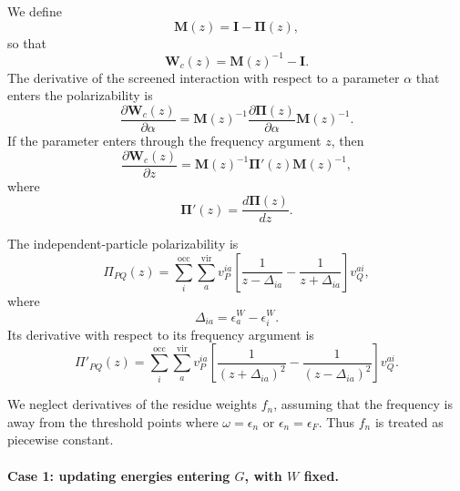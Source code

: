 We define
\begin{equation}
    \mathbf M(z)
    =
    \mathbf I-\boldsymbol{\Pi}(z),
\end{equation}
so that
\begin{equation}
    \mathbf W_c(z)
    =
    \mathbf M(z)^{-1}-\mathbf I.
\end{equation}
The derivative of the screened interaction with respect to a parameter
\(\alpha\) that enters the polarizability is
\begin{equation}
    \frac{\partial \mathbf W_c(z)}{\partial \alpha}
    =
    \mathbf M(z)^{-1}
    \frac{\partial \boldsymbol{\Pi}(z)}{\partial \alpha}
    \mathbf M(z)^{-1}.
\end{equation}
If the parameter enters through the frequency argument \(z\), then
\begin{equation}
    \frac{\partial \mathbf W_c(z)}{\partial z}
    =
    \mathbf M(z)^{-1}
    \boldsymbol{\Pi}'(z)
    \mathbf M(z)^{-1},
\end{equation}
where
\begin{equation}
    \boldsymbol{\Pi}'(z)
    =
    \frac{d\boldsymbol{\Pi}(z)}{dz}.
\end{equation}

The independent-particle polarizability is
\begin{equation}
    \Pi_{PQ}(z)
    =
    \sum_i^{\mathrm{occ}}
    \sum_a^{\mathrm{vir}}
    v_P^{ia}
    \left[
    \frac{1}{z-\Delta_{ia}}
    -
    \frac{1}{z+\Delta_{ia}}
    \right]
    v_Q^{ai},
\end{equation}
where
\begin{equation}
    \Delta_{ia}
    =
    \epsilon_a^W-\epsilon_i^W.
\end{equation}
Its derivative with respect to its frequency argument is
\begin{equation}
    \Pi'_{PQ}(z)
    =
    \sum_i^{\mathrm{occ}}
    \sum_a^{\mathrm{vir}}
    v_P^{ia}
    \left[
    \frac{1}{(z+\Delta_{ia})^2}
    -
    \frac{1}{(z-\Delta_{ia})^2}
    \right]
    v_Q^{ai}.
\end{equation}

We neglect derivatives of the residue weights \(f_n\), assuming that the
frequency is away from the threshold points where \(\omega=\epsilon_n\) or
\(\epsilon_n=\epsilon_F\).  Thus \(f_n\) is treated as piecewise constant.

\paragraph{Case 1: updating energies entering \(G\), with \(W\) fixed.}

